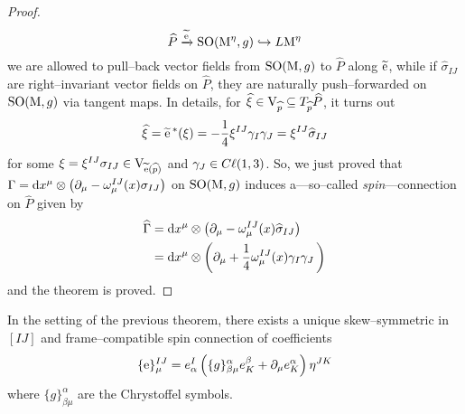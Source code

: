 \begin{proof}
    $$\widehat{P}\xrightarrow{\widetilde{\text{\normalfont e}}}\text{\normalfont SO}(\text{\normalfont M}^\eta,g)\hookrightarrow L\text{\normalfont M}^\eta$$
    we are allowed to pull--back vector fields from $\text{\normalfont SO}(\text{\normalfont M},g)$ to $\widehat{P}$ along $\widetilde{\text{\normalfont e}}$, while if $\widehat{\sigma}_{IJ}$ are right--invariant vector fields on $\widehat{P}$, they are naturally push--forwarded on $\text{\normalfont SO}(\text{\normalfont M},g)$ via tangent maps. In details, for $\widehat{\xi}\in\text{\normalfont V}_{\widehat{p}}\subseteq T_{\widehat{p}}\widehat{P}$, it turns out
    $$\widehat{\xi}=\widetilde{\text{\normalfont e}}\,^*(\xi)=-\frac{1}{4}\xi^{IJ}\gamma_I\gamma_J=\xi^{IJ}\widehat{\sigma}_{IJ}$$
    for some $\xi=\xi^{IJ}\sigma_{IJ}\in\text{\normalfont V}_{\widetilde{\text{\normalfont e}}(\widehat{p})}$ and $\gamma_J\in C\ell(1,3)$. So, we just proved that $\Gamma=\text{\normalfont d} x^\mu\otimes\left(\partial_\mu-\omega^{IJ}_\mu(x)\sigma_{IJ}\right)$ on $\text{\normalfont SO}(\text{\normalfont M},g)$ induces a---so--called \emph{spin}---connection on $\widehat{P}$ given by
    \begin{align*}
        \widehat{\Gamma}&=\text{\normalfont d} x^\mu\otimes\left(\partial_\mu-\omega^{IJ}_\mu(x)\widehat{\sigma}_{IJ}\right)\\
        &=\text{\normalfont d} x^\mu\otimes\left(\partial_\mu+\frac{1}{4}\omega^{IJ}_\mu(x)\gamma_I\gamma_J\,\right)
    \end{align*}
    and the theorem is proved.
\end{proof}


\begin{cor}\label{spin_connection}
    In the setting of the previous theorem, there exists a unique skew--symmetric in $[IJ]$ and frame--compatible spin connection of coefficients
    $$\{\text{\normalfont e}\}^{IJ}_\mu=e^I_\alpha\left(\{g\}^\alpha_{\beta\mu}e^\beta_K+\partial_\mu e^\alpha_K\right)\eta^{JK}$$
    where $\{g\}^\alpha_{\beta\mu}$ are the Chrystoffel symbols.
\end{cor}

